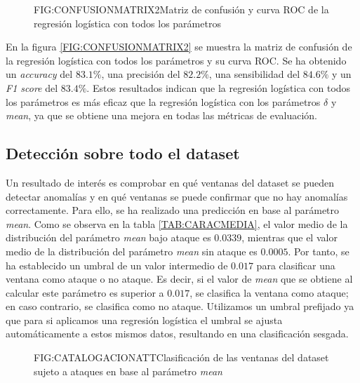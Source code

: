 \begin{figure}[Matriz de confusión y curva ROC de la regresión logística con todos los parámetros]{FIG:CONFUSIONMATRIX2}{Matriz de confusión y curva ROC de la regresión logística con todos los parámetros}
     \quad
\end{figure}

En la figura \ref{FIG:CONFUSIONMATRIX2} se muestra la matriz de confusión de la regresión logística con todos los parámetros y su curva \ac{ROC}. Se ha obtenido un \textit{accuracy} del $83.1\%$, una precisión del $82.2\%$, una sensibilidad del $84.6\%$ y un \textit{F1 score} del $83.4\%$. Estos resultados indican que la regresión logística con todos los parámetros es más eficaz que la regresión logística con los parámetros $\delta$ y \textit{mean}, ya que se obtiene una mejora en todas las métricas de evaluación.

\subsection{Detección sobre todo el dataset}\label{SUBSEC:DETECCIONDATASET}

Un resultado de interés es comprobar en qué ventanas del dataset se pueden detectar anomalías y en qué ventanas se puede confirmar que no hay anomalías correctamente. Para ello, se ha realizado una predicción en base al parámetro \textit{mean}. Como se observa en la tabla \ref{TAB:CARACMEDIA}, el valor medio de la distribución del parámetro \textit{mean} bajo ataque es $0.0339$, mientras que el valor medio de la distribución del parámetro \textit{mean} sin ataque es $0.0005$. Por tanto, se ha establecido un umbral de un valor intermedio de $0.017$ para clasificar una ventana como ataque o no ataque. Es decir, si el valor de \textit{mean} que se obtiene al calcular este parámetro es superior a $0.017$, se clasifica la ventana como ataque; en caso contrario, se clasifica como no ataque. Utilizamos un umbral prefijado ya que para si aplicamos una regresión logística el umbral se ajusta automáticamente a estos mismos datos, resultando en una clasificación sesgada.

\begin{figure}[Clasificación de las ventanas del dataset sujeto a ataques en base al parámetro \textit{mean}]{FIG:CATALOGACIONATT}{Clasificación de las ventanas del dataset sujeto a ataques en base al parámetro \textit{mean}}
    \label{FIG:CATALOGACIONATT}
\end{figure}

